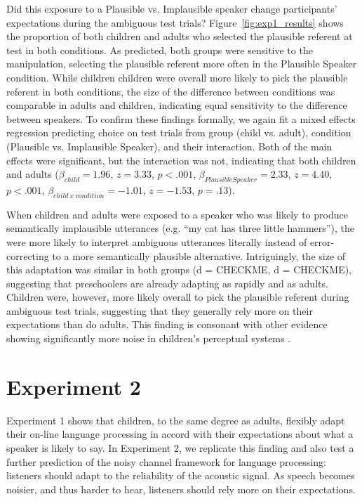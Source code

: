 \documentclass[man,floatsintext]{apa6}
\begin{document}
Did this exposure to a Plausible vs. Implausible speaker change participants' expectations during the ambiguous test trials? Figure~\ref{fig:exp1_results} shows the proportion of both children and adults who selected the plausible referent at test in both conditions. As predicted, both groups were sensitive to the manipulation, selecting the plausible referent more often in the Plausible Speaker condition. While children children were overall more likely to pick the plausible referent in both conditions, the size of the difference between conditions was comparable in adults and children, indicating equal sensitivity to the difference between speakers. To confirm these findings formally, we again fit a mixed effects regression predicting choice on test trials from group (child vs. adult), condition (Plausible vs. Implausible Speaker), and their interaction. Both of the main effects were significant, but the interaction was not, indicating that both children and adults  ($\beta_{child} = 1.96$,  $z = 3.33$, $p <.001$, $\beta_{Plausible Speaker} = 2.33$,  $z = 4.40$, $p <.001$,  $\beta_{child \: x \: condition} = -1.01$,  $z = -1.53$, $p = .13$).

When children and adults were exposed to a speaker who was likely to produce semantically implausible utterances (e.g. ``my cat has three little hammers''), the were more likely to interpret ambiguous utterances literally instead of error-correcting to a more semantically plausible alternative. Intriguingly, the size of this adaptation was similar in both groups (d = CHECKME, d = CHECKME), suggesting that preschoolers are already adapting as rapidly and as adults. Children were, however, more likely overall to pick the plausible referent during ambiguous test trials, suggesting that they generally rely more on their expectations than do adults. This finding is consonant with other evidence showing significantly more noise in children's perceptual systems \cite{neuman1983}.

\section{Experiment 2}

Experiment 1 shows that children, to the same degree as adults, flexibly adapt their on-line language processing in accord with their expectations about what a speaker is likely to say. In Experiment 2, we replicate this finding and also test a further prediction of the noisy channel framework for language processing: listeners should adapt to the reliability of the acoustic signal. As speech becomes noisier, and thus harder to hear, listeners should rely more on their expectations. 
\end{document}
